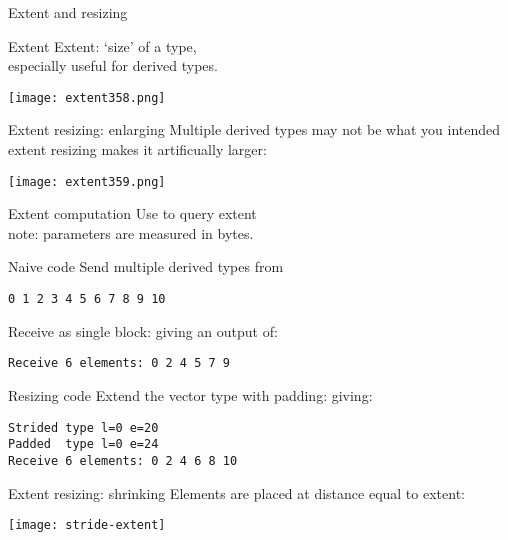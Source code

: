  {Extent and resizing}

\begin{numberedframe}{Extent}
  Extent: `size' of a type,\\
  especially useful for derived types.

  \texttt{[image: extent358.png]}
\end{numberedframe}

\begin{numberedframe}{Extent resizing: enlarging}
  Multiple derived types may not be what you intended\\
  extent resizing makes it artificually larger:

  \texttt{[image: extent359.png]}
\end{numberedframe}

\begin{numberedframe}{Extent computation}
  Use  to query extent\\
  note: parameters are measured in bytes.

\end{numberedframe}

\begin{numberedframe}{Naive code}
  Send multiple derived types
  from
\begin{verbatim}
0 1 2 3 4 5 6 7 8 9 10
\end{verbatim}

  Receive as single block:
giving an output of:
\begin{verbatim}
Receive 6 elements: 0 2 4 5 7 9
\end{verbatim}
\end{numberedframe}

\begin{numberedframe}{Resizing code}
  Extend the vector type with padding:
giving:
\begin{verbatim}
Strided type l=0 e=20
Padded  type l=0 e=24
Receive 6 elements: 0 2 4 6 8 10
\end{verbatim}
\end{numberedframe}


\begin{numberedframe}{Extent resizing: shrinking}
  Elements are placed at distance equal to extent:

  \texttt{[image: stride-extent]}
\end{numberedframe}


